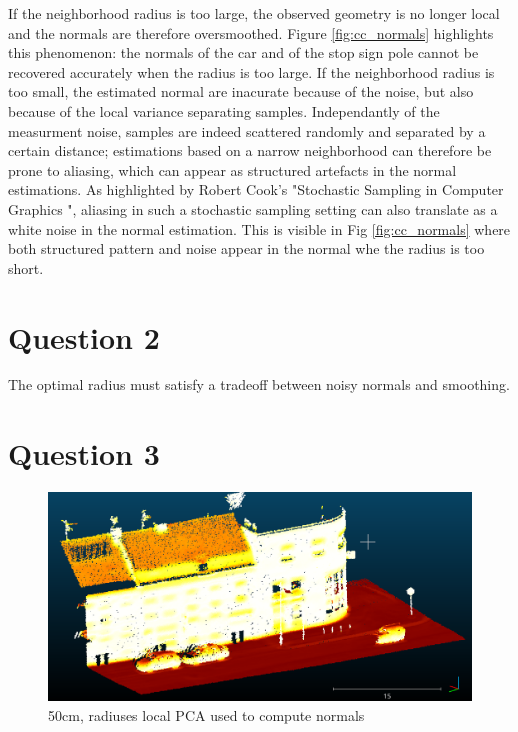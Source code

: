 \documentclass[a4paper]{article}
\begin{document}
If the neighborhood radius is too large, the observed geometry is no longer local and the normals are therefore oversmoothed.
Figure \ref{fig:cc_normals} highlights this phenomenon: the normals of the car and of the stop sign pole cannot be recovered accurately when the radius is too large.
If the neighborhood radius is too small, the estimated normal are inacurate because of the noise, but also because of the local variance separating samples.
Independantly of the measurment noise, samples are indeed scattered randomly and separated by a certain distance; estimations based on a narrow neighborhood can therefore
be prone to aliasing, which can appear as structured artefacts in the normal estimations. As highlighted by Robert Cook's "Stochastic Sampling in Computer Graphics 
", aliasing in such a stochastic sampling setting can also translate as a white noise in the normal estimation. This is visible in Fig \ref{fig:cc_normals} where both structured pattern
and noise appear in the normal whe the radius is too short.



\section*{Question 2}
The optimal radius must satisfy a tradeoff between noisy normals and smoothing.


\section*{Question 3}
\begin{figure}[ht]
  \centering
  \includegraphics[width=.9\linewidth]{figures/cc_normals_PCA_50cm_bigger_points.png}
  \caption{50cm, radiuses local PCA used to compute normals}
  \label{fig:local_pca}
\end{figure}
\end{document}
